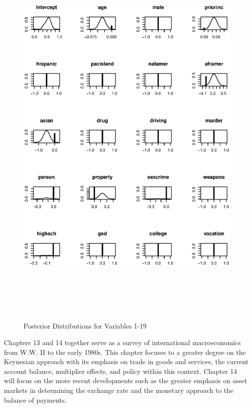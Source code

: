 \begin{figure}[t]
\begin{center}
\includegraphics[height=20cm,width=14.5cm]{graphapp031.eps}
\caption{Posterior Distributions for Variables 1-19}
\end{center}
\end{figure}

Chapters 13 and 14 together serve as a survey of international
macroeconomics from W.W. II to the early 1980s.  This chapter
focuses to a greater degree on the Keynesian approach with its
emphasis on trade in goods and services, the current account
balance, multiplier effects, and policy within this context. Chapter
14 will focus on the more recent developments such as the greater
emphasis on asset markets in determining the exchange rate and the
monetary approach to the balance of payments.

